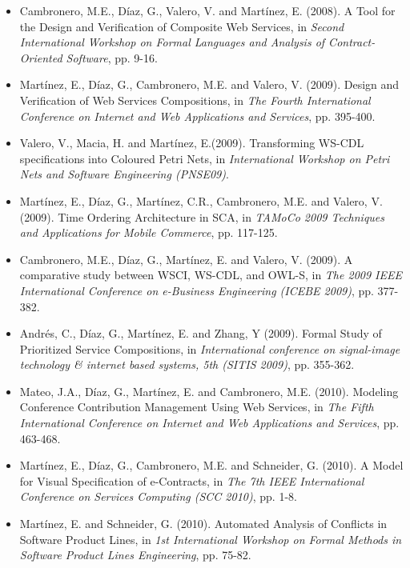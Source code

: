 \begin{itemize}

\item
Cambronero, M.E., D\'iaz, G., Valero, V. and Mart\'inez, E. (2008). A Tool for the Design and Verification of Composite Web Services, in \emph{Second International Workshop on Formal Languages and Analysis of Contract-Oriented Software}, pp. 9-16.

\item 
Mart\'inez, E., D\'iaz, G., Cambronero, M.E. and Valero, V. (2009). Design and Verification of Web Services Compositions, in \emph{The Fourth International Conference on Internet and Web Applications and Services}, pp. 395-400.

\item
Valero, V., Macia, H. and Mart\'inez, E.(2009). Transforming WS-CDL specifications into Coloured Petri Nets, in \emph{International Workshop on Petri Nets and Software Engineering (PNSE09)}.

\item
Mart\'inez, E., D\'iaz, G., Mart\'inez, C.R., Cambronero, M.E. and Valero, V. (2009). Time Ordering Architecture in SCA, in \emph{TAMoCo 2009 Techniques and Applications for Mobile Commerce}, pp. 117-125.

\item
Cambronero, M.E., D\'iaz, G., Mart\'inez, E. and Valero, V. (2009). A comparative study between WSCI, WS-CDL, and OWL-S, in \emph{The 2009 IEEE International Conference on e-Business Engineering (ICEBE 2009)}, pp. 377-382.

\item 
Andr\'es, C., D\'iaz, G., Mart\'inez, E. and Zhang, Y (2009). Formal Study of Prioritized Service Compositions, in \emph{International conference on signal-image technology \& internet based systems, 5th (SITIS 2009)}, pp. 355-362.

\item 
Mateo, J.A., D\'iaz, G., Mart\'inez, E. and Cambronero, M.E. (2010). Modeling Conference Contribution Management Using Web Services, in \emph{The Fifth International Conference on Internet and Web Applications and Services}, pp. 463-468.

\item
Mart\'inez, E., D\'iaz, G., Cambronero, M.E. and Schneider, G. (2010). A Model for Visual Specification of e-Contracts, in \emph{The 7th IEEE International Conference on Services Computing (SCC 2010)}, pp. 1-8.

\item
Mart\'inez, E. and Schneider, G. (2010). Automated Analysis of Conflicts in Software Product Lines, in \emph{1st International Workshop on Formal Methods in Software Product Lines Engineering}, pp. 75-82.


\end{itemize}
